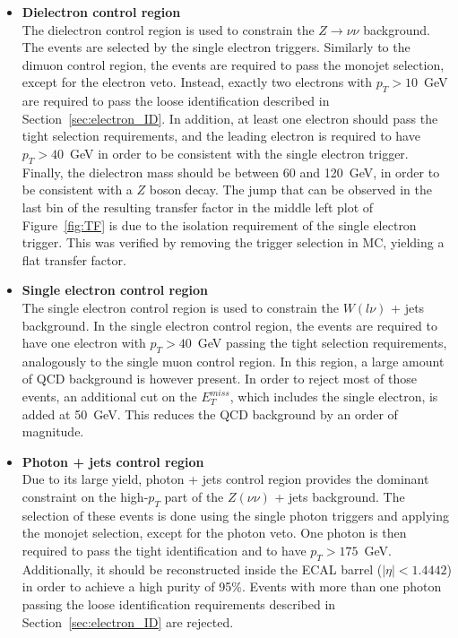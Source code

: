 \begin{itemize}
\item[] \textbf{Dielectron control region}\\ The dielectron control region is used to constrain the $Z\rightarrow\nu\nu$ background. The events are selected by the single electron triggers. Similarly to the dimuon control region, the events are required to pass the monojet selection, except for the electron veto. Instead, exactly two electrons with $p_T > 10$~GeV are required to pass the loose identification described in Section~\ref{sec:electron_ID}. In addition, at least one electron should pass the tight selection requirements, and the leading electron is required to have $p_T > 40$~GeV in order to be consistent with the single electron trigger. Finally, the dielectron mass should be between 60 and 120~GeV, in order to be consistent with a $Z$ boson decay. The jump that can be observed in the last bin of the resulting transfer factor in the middle left plot of Figure~\ref{fig:TF} is due to the isolation requirement of the single electron trigger. This was verified by removing the trigger selection in MC, yielding a flat transfer factor.

\item[] \textbf{Single electron control region}\\ The single electron control region is used to constrain the $W(l\nu)$ + jets background. In the single electron control region, the events are required to have one electron with $p_T > 40$~GeV passing the tight selection requirements, analogously to the single muon control region. In this region, a large amount of QCD background is however present. In order to reject most of those events, an additional cut on the $E_T^{miss}$, which includes the single electron, is added at 50~GeV. This reduces the QCD background by an order of magnitude.

\item[] \textbf{Photon + jets control region}\\Due to its large yield, photon + jets control region provides the dominant constraint on the high-$p_T$ part of the $Z(\nu\nu)$ + jets background. The selection of these events is done using the single photon triggers and applying the monojet selection, except for the photon veto. One photon is then required to pass the tight identification and to have $p_T > 175$~GeV. Additionally, it should be reconstructed inside the \ac{ECAL} barrel ($|\eta| < 1.4442$) in order to achieve a high purity of 95\%. Events with more than one photon passing the loose identification requirements described in Section~\ref{sec:electron_ID} are rejected.
\end{itemize}


